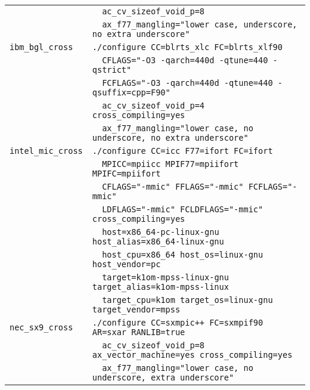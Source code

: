 \documentclass[a4paper]{jarticle}
\begin{document}
{{{{\begin{table}[htbp]
\begin{center}
\begin{tabular}{|l|l|}
                          & \verb+  ac_cv_sizeof_void_p=8+ \\
                          & \verb+  ax_f77_mangling="lower case, underscore, no extra underscore" + \\ \hline
\verb+ibm_bgl_cross+      & \verb+./configure CC=blrts_xlc FC=blrts_xlf90+ \\
                          & \verb+  CFLAGS="-O3 -qarch=440d -qtune=440 -qstrict"+ \\
                          & \verb+  FCFLAGS="-O3 -qarch=440d -qtune=440 -qsuffix=cpp=F90"+ \\
                          & \verb+  ac_cv_sizeof_void_p=4 cross_compiling=yes+\\
                          & \verb+  ax_f77_mangling="lower case, no underscore, no extra underscore"+ \\ \hline
\verb+intel_mic_cross+    & \verb+./configure CC=icc F77=ifort FC=ifort+ \\
                          & \verb+  MPICC=mpiicc MPIF77=mpiifort MPIFC=mpiifort+ \\
                          & \verb+  CFLAGS="-mmic" FFLAGS="-mmic" FCFLAGS="-mmic"+ \\
                          & \verb+  LDFLAGS="-mmic" FCLDFLAGS="-mmic" cross_compiling=yes+ \\
                          & \verb+  host=x86_64-pc-linux-gnu host_alias=x86_64-linux-gnu+ \\
                          & \verb+  host_cpu=x86_64 host_os=linux-gnu host_vendor=pc+ \\
                          & \verb+  target=k1om-mpss-linux-gnu target_alias=k1om-mpss-linux+ \\
                          & \verb+  target_cpu=k1om target_os=linux-gnu target_vendor=mpss+ \\ \hline
\verb+nec_sx9_cross+      & \verb|./configure CC=sxmpic++ FC=sxmpif90 AR=sxar RANLIB=true | \\
                          & \verb+  ac_cv_sizeof_void_p=8 ax_vector_machine=yes cross_compiling=yes+ \\ 
                          & \verb+  ax_f77_mangling="lower case, no underscore, extra underscore"+ \\ \hline
\end{tabular}
\end{center}
\end{table}

}}}}
\end{document}
